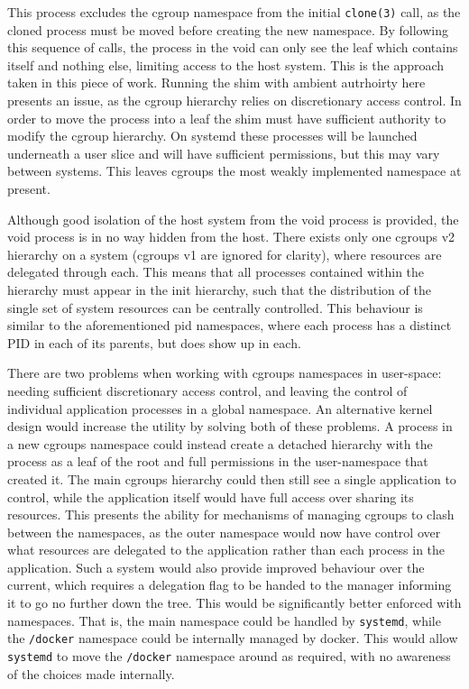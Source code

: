 \documentclass[12pt,a4paper,twoside]{report}
\begin{document}
This process excludes the cgroup namespace from the initial \texttt{clone(3)} call, as the cloned process must be moved before creating the new namespace. By following this sequence of calls, the process in the void can only see the leaf which contains itself and nothing else, limiting access to the host system.  This is the approach taken in this piece of work. Running the shim with ambient autrhoirty here presents an issue, as the cgroup hierarchy relies on discretionary access control. In order to move the process into a leaf the shim must have sufficient authority to modify the cgroup hierarchy. On systemd these processes will be launched underneath a user slice and will have sufficient permissions, but this may vary between systems. This leaves cgroups the most weakly implemented namespace at present.

Although good isolation of the host system from the void process is provided, the void process is in no way hidden from the host. There exists only one cgroups v2 hierarchy on a system (cgroups v1 are ignored for clarity), where resources are delegated through each. This means that all processes contained within the hierarchy must appear in the init hierarchy, such that the distribution of the single set of system resources can be centrally controlled. This behaviour is similar to the aforementioned pid namespaces, where each process has a distinct PID in each of its parents, but does show up in each.

There are two problems when working with cgroups namespaces in user-space: needing sufficient discretionary access control, and leaving the control of individual application processes in a global namespace. An alternative kernel design would increase the utility by solving both of these problems. A process in a new cgroups namespace could instead create a detached hierarchy with the process as a leaf of the root and full permissions in the user-namespace that created it. The main cgroups hierarchy could then still see a single application to control, while the application itself would have full access over sharing its resources.  This presents the ability for mechanisms of managing cgroups to clash between the namespaces, as the outer namespace would now have control over what resources are delegated to the application rather than each process in the application. Such a system would also provide improved behaviour over the current, which requires a delegation flag to be handed to the manager informing it to go no further down the tree. This would be significantly better enforced with namespaces. That is, the main namespace could be handled by \texttt{systemd}, while the \texttt{/docker} namespace could be internally managed by docker. This would allow \texttt{systemd} to move the \texttt{/docker} namespace around as required, with no awareness of the choices made internally.
\end{document}
